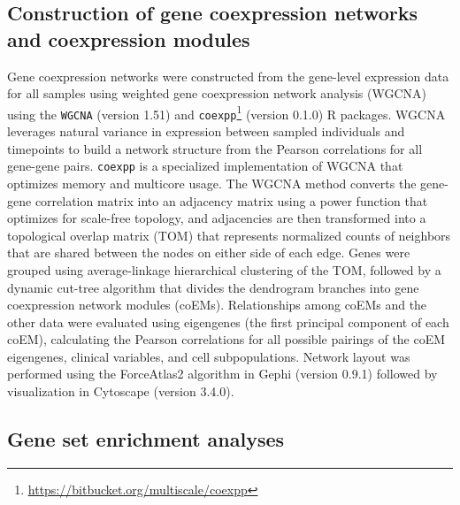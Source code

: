 \subsection{Construction of gene coexpression networks and coexpression modules}

Gene coexpression networks were constructed from the gene-level expression data for all samples using weighted gene coexpression network analysis (WGCNA) using the \texttt{WGCNA}\autocite{Zhang2005} (version 1.51) and \texttt{coexpp}\footnote{\url{https://bitbucket.org/multiscale/coexpp}} (version 0.1.0) R packages. WGCNA leverages natural variance in expression between sampled individuals and timepoints to build a network structure from the Pearson correlations for all gene-gene pairs.\autocite{Zhang2005} \texttt{coexpp} is a specialized implementation of WGCNA that optimizes memory and multicore usage. The WGCNA method converts the gene-gene correlation matrix into an adjacency matrix using a power function that optimizes for scale-free topology, and adjacencies are then transformed into a topological overlap matrix (TOM) that represents normalized counts of neighbors that are shared between the nodes on either side of each edge. Genes were grouped using average-linkage hierarchical clustering of the TOM, followed by a dynamic cut-tree algorithm\autocite{Langfelder2008} that divides the dendrogram branches into gene coexpression network modules (coEMs). Relationships among coEMs and the other data were evaluated using eigengenes\autocite{Langfelder2007} (the first principal component of each coEM), calculating the Pearson correlations for all possible pairings of the coEM eigengenes, clinical variables, and cell subpopulations. Network layout was performed using the ForceAtlas2 algorithm in Gephi (version 0.9.1) followed by visualization in Cytoscape\autocite{Smoot2011} (version 3.4.0).

\subsection{Gene set enrichment analyses}

